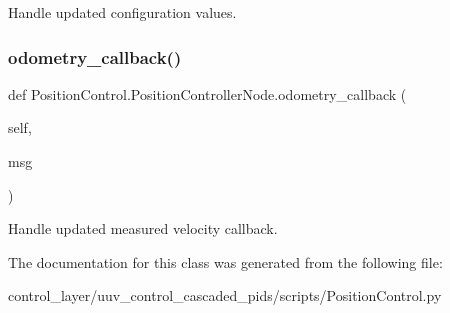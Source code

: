 \begin{DoxyVerb}Handle updated configuration values.\end{DoxyVerb}
 \mbox{\label{classPositionControl_1_1PositionControllerNode_aa8a67e3bf22291ac2954fde652427037}} 
\subsubsection{\texorpdfstring{odometry\+\_\+callback()}{odometry\_callback()}}
{\footnotesize\ttfamily def Position\+Control.\+Position\+Controller\+Node.\+odometry\+\_\+callback (\begin{DoxyParamCaption}\item[{}]{self,  }\item[{}]{msg }\end{DoxyParamCaption})}

\begin{DoxyVerb}Handle updated measured velocity callback.\end{DoxyVerb}
 

The documentation for this class was generated from the following file\+:\begin{DoxyCompactItemize}
\item 
control\+\_\+layer/uuv\+\_\+control\+\_\+cascaded\+\_\+pids/scripts/Position\+Control.\+py\end{DoxyCompactItemize}
